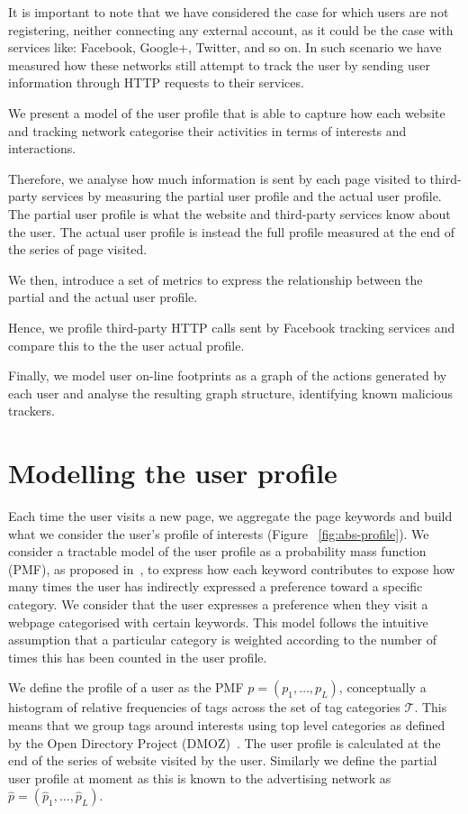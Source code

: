 It is important to note that we have considered the case for which users are not registering, neither connecting any external account, as it could be the case with services like: Facebook, Google+, Twitter, and so on. In such scenario we have measured how these networks still attempt to track the user by sending user information through HTTP requests to their services.

We present a model of the user profile that is able to capture how each website and tracking network categorise their activities in terms of interests and interactions.

Therefore, we analyse how much information is sent by each page visited to third-party services by measuring the partial user profile and the actual user profile. The partial user profile is what the website and third-party services know about the user. The actual user profile is instead the full profile measured at the end of the series of page visited.

We then, introduce a set of metrics to express the relationship between the partial and the actual user profile.

Hence, we profile third-party HTTP calls sent by Facebook tracking services and compare this to the the user actual profile.

Finally, we model user on-line footprints as a graph of the actions generated by each user and analyse the resulting graph structure, identifying known malicious trackers.

\section{Modelling the user profile}
\label{sec:mod-profile}
Each time the user visits a new page, we aggregate the page keywords and build what we consider the user's profile of interests (Figure ~\ref{fig:abs-profile}). We consider a tractable model of the user profile as a probability mass function (PMF), as proposed in~\cite{Parra12DKE,Parra12TKDE}, to express how each keyword contributes to expose how many times the user has indirectly expressed a preference toward a specific category. We consider that the user expresses a preference when they visit a webpage categorised with certain keywords. This model follows the intuitive assumption that a particular category is weighted according to the number of times this has been counted in the user profile.

We define the profile of a user as the PMF $p = (p_1,\ldots, p_L)$, conceptually a histogram of relative frequencies of tags across the set of tag categories $\mathcal{T}$. This means that we group tags around interests using top level categories as defined by the Open Directory Project (DMOZ)~\cite{a22}.
The user profile is calculated at the end of the series of website visited by the user. Similarly we define the partial user profile at moment as this is known to the advertising network as  $\hat{p} = (\hat{p}_1,\ldots, \hat{p}_L)$.

